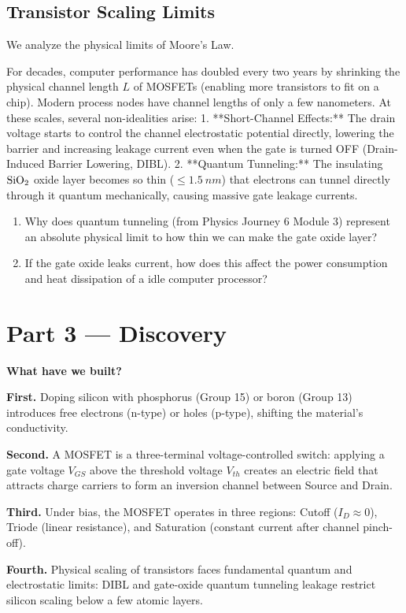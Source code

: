 \documentclass[12pt, a4paper]{book}
\begin{document}
\subsection{Transistor Scaling Limits}

We analyze the physical limits of Moore's Law.

\begin{explobox}
For decades, computer performance has doubled every two years by shrinking the physical channel length $L$ of MOSFETs (enabling more transistors to fit on a chip).
Modern process nodes have channel lengths of only a few nanometers.
At these scales, several non-idealities arise:
1. **Short-Channel Effects:** The drain voltage starts to control the channel electrostatic potential directly, lowering the barrier and increasing leakage current even when the gate is turned OFF (Drain-Induced Barrier Lowering, DIBL).
2. **Quantum Tunneling:** The insulating $\ce{SiO2}$ oxide layer becomes so thin ($\le \SI{1.5}{nm}$) that electrons can tunnel directly through it quantum mechanically, causing massive gate leakage currents.
\begin{enumerate}[label=(\alph*), leftmargin=*]
  \item Why does quantum tunneling (from Physics Journey 6 Module 3) represent an absolute physical limit to how thin we can make the gate oxide layer?
  \item If the gate oxide leaks current, how does this affect the power consumption and heat dissipation of a idle computer processor?
\end{enumerate}
\end{explobox}

\newpage

\section{Part 3 --- Discovery}

\begin{discoverybox}
\textbf{What have we built?}

\textbf{First.} Doping silicon with phosphorus (Group 15) or boron (Group 13) introduces free electrons (n-type) or holes (p-type), shifting the material's conductivity.

\textbf{Second.} A MOSFET is a three-terminal voltage-controlled switch: applying a gate voltage $V_{GS}$ above the threshold voltage $V_{th}$ creates an electric field that attracts charge carriers to form an inversion channel between Source and Drain.

\textbf{Third.} Under bias, the MOSFET operates in three regions: Cutoff ($I_D \approx 0$), Triode (linear resistance), and Saturation (constant current after channel pinch-off).

\textbf{Fourth.} Physical scaling of transistors faces fundamental quantum and electrostatic limits: DIBL and gate-oxide quantum tunneling leakage restrict silicon scaling below a few atomic layers.
\end{discoverybox}
\end{document}
